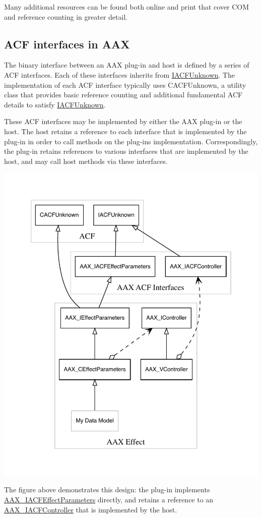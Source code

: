Many additional resources can be found both online and print that cover C\+OM and reference counting in greater detail.\hypertarget{a00827_acf_in_aax}{}\subsection{A\+C\+F interfaces in A\+AX}\label{a00827_acf_in_aax}
The binary interface between an A\+AX plug-\/in and host is defined by a series of A\+CF interfaces. Each of these interfaces inherits from \mbox{\hyperlink{a01409}{I\+A\+C\+F\+Unknown}}. The implementation of each A\+CF interface typically uses {\ttfamily C\+A\+C\+F\+Unknown}, a utility class that provides basic reference counting and additional fundamental A\+CF details to satisfy \mbox{\hyperlink{a01409}{I\+A\+C\+F\+Unknown}}.

These A\+CF interfaces may be implemented by either the A\+AX plug-\/in or the host. The host retains a reference to each interface that is implemented by the plug-\/in in order to call methods on the plug-\/in\textquotesingle{}s implementation. Correspondingly, the plug-\/in retains references to various interfaces that are implemented by the host, and may call host methods via these interfaces.


\begin{DoxyImage}
\includegraphics[width=\textwidth,height=\textheight/2,keepaspectratio=true]{dot_aax_acf_versioning_plug-in}
\end{DoxyImage}
 The figure above demonstrates this design\+: the plug-\/in implements \mbox{\hyperlink{a01669}{A\+A\+X\+\_\+\+I\+A\+C\+F\+Effect\+Parameters}} directly, and retains a reference to an \mbox{\hyperlink{a01637}{A\+A\+X\+\_\+\+I\+A\+C\+F\+Controller}} that is implemented by the host.

